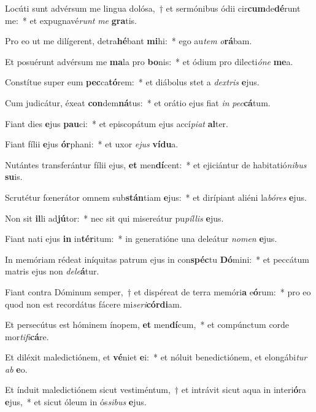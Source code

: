 \item Locúti sunt advérsum me lingua dolósa,~† et sermónibus ódii cir\textbf{cum}de\textbf{dé}runt me:~* et expugnavé\textit{runt} \textit{me} \textbf{gra}tis.
\item Pro eo ut me dilígerent, detra\textbf{hé}bant \textbf{mi}hi:~* ego au\textit{tem} \textit{o}\textbf{rá}bam.
\item Et posuérunt advérsum me \textbf{ma}la pro \textbf{bo}nis:~* et ódium pro dilecti\textit{ó}\textit{ne} \textbf{me}a.
\item Constítue super eum \textbf{pec}ca\textbf{tó}rem:~* et diábolus stet a \textit{dex}\textit{tris} \textbf{e}jus.
\item Cum judicátur, éxeat \textbf{con}dem\textbf{ná}tus:~* et orátio ejus fiat \textit{in} \textit{pec}\textbf{cá}tum.
\item Fiant dies \textbf{e}jus \textbf{pau}ci:~* et episcopátum ejus accí\textit{pi}\textit{at} \textbf{al}ter.
\item Fiant fílii \textbf{e}jus \textbf{ór}phani:~* et uxor \textit{e}\textit{jus} \textbf{ví}\textbf{du}a.
\item Nutántes transferántur fílii ejus, \textbf{et} men\textbf{dí}cent:~* et ejiciántur de habitatió\textit{ni}\textit{bus} \textbf{su}is.
\item Scrutétur fœnerátor omnem sub\textbf{stán}tiam \textbf{e}jus:~* et dirípiant aliéni la\textit{bó}\textit{res} \textbf{e}jus.
\item Non sit \textbf{il}li ad\textbf{jú}tor:~* nec sit qui misereátur pu\textit{píl}\textit{lis} \textbf{e}jus.
\item Fiant nati ejus \textbf{in} in\textbf{tér}itum:~* in generatióne una deleátur \textit{no}\textit{men} \textbf{e}jus.
\item In memóriam rédeat iníquitas patrum ejus in con\textbf{spéc}tu \textbf{Dó}mini:~* et peccátum matris ejus non \textit{de}\textit{le}\textbf{á}tur.
\item Fiant contra Dóminum semper,~† et dispéreat de terra memóri\textbf{a} e\textbf{ó}rum:~* pro eo quod non est recordátus fácere mi\textit{se}\textit{ri}\textbf{cór}\textbf{di}am.
\item Et persecútus est hóminem ínopem, \textbf{et} men\textbf{dí}cum,~* et compúnctum corde mor\textit{ti}\textit{fi}\textbf{cá}re.
\item Et diléxit maledictiónem, et \textbf{vé}niet \textbf{e}i:~* et nóluit benedictiónem, et elongábi\textit{tur} \textit{ab} \textbf{e}o.
\item Et índuit maledictiónem sicut vestiméntum,~† et intrávit sicut aqua in interi\textbf{ó}ra \textbf{e}jus,~* et sicut óleum in ós\textit{si}\textit{bus} \textbf{e}jus.
